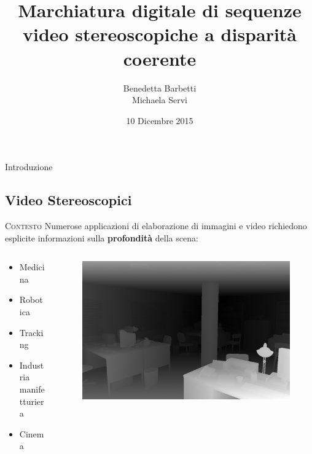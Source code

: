 \documentclass{beamer}
\title{Marchiatura digitale di sequenze video stereoscopiche a disparit\`{a} coerente}
\author{Benedetta Barbetti\\ 
		Michaela Servi}
\institute{Universit\`{a} degli studi di Firenze}
\date{10 Dicembre 2015}
\begin{document}
\begin{frame}
\titlepage
\end{frame}

\begin{section}{Introduzione}
\subsection{Video Stereoscopici}

\begin{frame}[t]{\textsc{Contesto}}
Numerose applicazioni di elaborazione di immagini e video richiedono esplicite informazioni sulla \textbf{profondit\`{a}} della scena:
\begin{columns}
\begin{column}{4cm}
\begin{center}
			\vspace*{0.5em}
			\begin{itemize}
			\item \small{Medicina} 
			\item Robotica
			\item Tracking
			\item Industria manifetturiera
			\item Cinema
			\end{itemize}

\end{center}
\end{column}
\begin{column}{6cm}
\begin{figure}
\centering
\includegraphics[width=1\linewidth]{./img/dm.jpg}
\end{figure}
\end{column}
\end{columns}
\end{frame}



\end{section}
\end{document}
